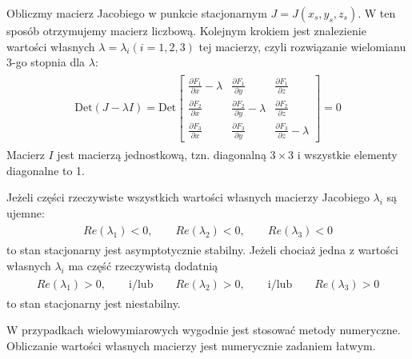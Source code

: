 \documentclass[a4paper,12pt,polish]{sphinxmanual}
\begin{document}
Obliczmy  macierz Jacobiego w punkcie stacjonarnym $J=J(x_s, y_s, z_s)$.  W ten sposób otrzymujemy macierz liczbową. Kolejnym krokiem jest znalezienie wartości własnych $\lambda = \lambda_i   (i=1, 2, 3)$   tej macierzy, czyli rozwiązanie  wielomianu 3-go stopnia dla $\lambda$:
\label{ch1/chI023:equation-eqn55}\begin{gather}
\begin{split} \mbox{Det} (J -\lambda I)  = \mbox{Det}  \begin{bmatrix}\frac{ \partial F_1}{\partial x} -\lambda & \frac{\partial F_1}{\partial y}&\frac{ \partial F_1}{\partial z}\\ \frac{ \partial F_2}{\partial x}&  \frac{ \partial F_2}{\partial y} -\lambda &\frac{ \partial F_2}{\partial z} \\ \frac{ \partial F_3}{\partial x}& \frac{ \partial F_3}{\partial y}&\frac{ \partial F_3}{\partial z} -\lambda \end{bmatrix}  =  0\end{split}\label{ch1/chI023-eqn55}
\end{gather}
Macierz $I$ jest macierzą jednostkową, tzn. diagonalną $3\times 3$ i wszystkie elementy diagonalne to 1.

Jeżeli części  rzeczywiste  wszystkich wartości własnych macierzy Jacobiego $\lambda_i$ są  ujemne:
\label{ch1/chI023:equation-eqn56}\begin{gather}
\begin{split} Re(\lambda_1) < 0, \quad \quad Re(\lambda_2) < 0, \quad \quad Re(\lambda_3) < 0\end{split}\label{ch1/chI023-eqn56}
\end{gather}
to  stan stacjonarny jest asymptotycznie stabilny. Jeżeli  chociaż jedna z wartości własnych $\lambda_i$ ma część rzeczywistą dodatnią
\label{ch1/chI023:equation-eqn57}\begin{gather}
\begin{split} Re(\lambda_1) > 0, \quad \quad \mbox{i/lub} \quad \quad Re(\lambda_2) >  0, \quad \quad \mbox{i/lub} \quad \quad Re(\lambda_3) >  0\end{split}\label{ch1/chI023-eqn57}
\end{gather}
to stan stacjonarny jest niestabilny.

W przypadkach wielowymiarowych wygodnie jest stosować metody numeryczne. Obliczanie wartości własnych macierzy jest numerycznie zadaniem łatwym.
\end{document}
